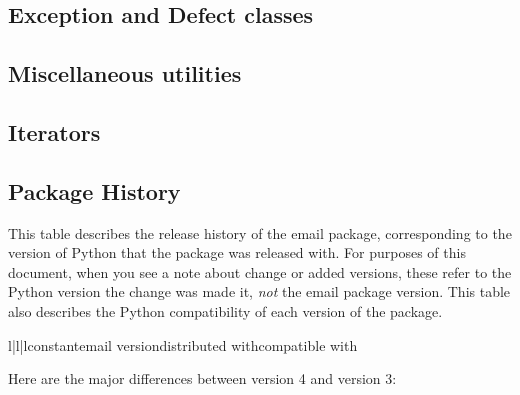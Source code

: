 \subsection{Exception and Defect classes}


\subsection{Miscellaneous utilities}


\subsection{Iterators}


\subsection{Package History\label{email-pkg-history}}

This table describes the release history of the email package, corresponding
to the version of Python that the package was released with.  For purposes of
this document, when you see a note about change or added versions, these refer
to the Python version the change was made it, \emph{not} the email package
version.  This table also describes the Python compatibility of each version
of the package.

\begin{tableiii}{l|l|l}{constant}{email version}{distributed with}{compatible with}
\end{tableiii}

Here are the major differences between  version 4 and version 3:

